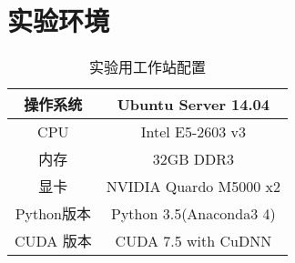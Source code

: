 \chapter{实验环境}

\begin{table}[ht]
\centering
\caption{实验用工作站配置}\label{Tab:WorkstationInfo}
\begin{tabular}{|c|c|}
\hline
操作系统 & Ubuntu Server 14.04 \\
\hline
CPU & Intel E5-2603 v3 \\
\hline
内存 & 32GB DDR3 \\
\hline
显卡 & NVIDIA Quardo M5000 x2 \\
\hline
Python版本 & Python 3.5(Anaconda3 4) \\
\hline
CUDA 版本 & CUDA 7.5 with CuDNN \\
\hline
\end{tabular}
\end{table}